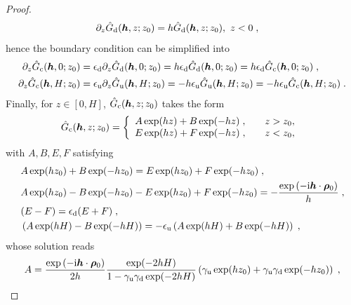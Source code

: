 \begin{proof}
\begin{align*}
     \partial_z\Hat{G}_{\mathrm{d}}(\boldsymbol{h}, z; z_0)&=h\Hat{G}_{\mathrm{d}}(\boldsymbol{h}, z; z_0),~z < 0\;,
\end{align*}
hence the boundary condition can be  simplified into
\begin{align*}
  \partial_z\Hat{G}_{\mathrm{c}}(\boldsymbol{h}, 0; z_0)&=\epsilon_{\mathrm{d}} \partial_z\Hat{G}_{\mathrm{d}}(\boldsymbol{h}, 0; z_0)= h \epsilon_{\mathrm{d}} \Hat{G}_{\mathrm{d}}(\boldsymbol{h}, 0; z_0)= h\epsilon_{\mathrm{d}} \Hat{G}_{\mathrm{c}}(\boldsymbol{h}, 0; z_0)\;,\\
   \partial_z\Hat{G}_{\mathrm{c}}(\boldsymbol{h}, H; z_0)&=\epsilon_{\mathrm{u}} \partial_z\Hat{G}_{\mathrm{u}}(\boldsymbol{h}, H; z_0)=- h \epsilon_{\mathrm{u}} \Hat{G}_{\mathrm{u}}(\boldsymbol{h}, H; z_0)=-h\epsilon_{\mathrm{u}} \Hat{G}_{\mathrm{c}}(\boldsymbol{h}, H; z_0)\;.
\end{align*} 
Finally, for $z\in[0, H]$, $\Hat{G}_{\mathrm{c}}(\boldsymbol{h}, z; z_0)$ takes the form
\begin{equation*}
    \Hat{G}_{\mathrm{c}}(\boldsymbol{h}, z; z_0)=\left \{
            \begin{array}{cc}
                \begin{aligned}
                    & A\exp(h z)+B\exp(-h z)\;,
                \end{aligned} & z>z_0, \\
                \begin{aligned}
                 & E\exp(h z)+F\exp(-h z)\;,
                \end{aligned} & z<z_0,
            \end{array}
        \right. \;
\end{equation*}
with $A, B, E, F$ satisfying
\begin{equation}\label{proof...Matrix}
\begin{aligned}
 &A\exp(hz_0)+B\exp(-hz_0)  = E\exp(hz_0)+F\exp(-hz_0)\;,\\
 &A\exp(hz_0)-B\exp(-hz_0)-E\exp(hz_0)+F\exp(-hz_0)=-\frac{ \exp{(-\mathrm{i} \boldsymbol{h} \cdot \boldsymbol{\rho}_0)}}{h }\;,\\
 & (E-F)=\epsilon_{\mathrm{d}}(E+F)\;,\\
 & \left(A\exp(hH)-B\exp(-hH)\right)=-\epsilon_{\mathrm{u}}\left(A\exp(hH)+B\exp(-hH)\right)\;,
\end{aligned}\end{equation}
whose solution reads
\begin{align*}
A&=\frac{ \exp{(-\mathrm{i} \V{h} \cdot \V{\rho}_0)}}{2h }\frac{\exp(-2hH)}{1-\gamma_{\mrm{u}}\gamma_{\mrm{d}}\exp(-2hH)} \left(\gamma_{\mrm{u}}\exp(hz_0)+\gamma_{\mrm{u}}\gamma_{\mrm{d}}\exp(-hz_0)\right)\;,\\

\end{align*}
\end{proof}
